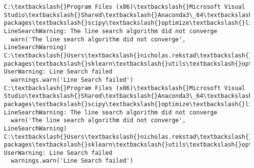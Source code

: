 \documentclass[11pt]{article}
\begin{document}
    \begin{Verbatim}[commandchars=\\\{\}]
C:\textbackslash{}Program Files (x86)\textbackslash{}Microsoft Visual Studio\textbackslash{}Shared\textbackslash{}Anaconda3\_64\textbackslash{}lib\textbackslash{}site-packages\textbackslash{}scipy\textbackslash{}optimize\textbackslash{}linesearch.py:313: LineSearchWarning: The line search algorithm did not converge
  warn('The line search algorithm did not converge', LineSearchWarning)
C:\textbackslash{}Users\textbackslash{}nicholas.rekstad\textbackslash{}AppData\textbackslash{}Roaming\textbackslash{}Python\textbackslash{}Python36\textbackslash{}site-packages\textbackslash{}sklearn\textbackslash{}utils\textbackslash{}optimize.py:195: UserWarning: Line Search failed
  warnings.warn('Line Search failed')
C:\textbackslash{}Program Files (x86)\textbackslash{}Microsoft Visual Studio\textbackslash{}Shared\textbackslash{}Anaconda3\_64\textbackslash{}lib\textbackslash{}site-packages\textbackslash{}scipy\textbackslash{}optimize\textbackslash{}linesearch.py:313: LineSearchWarning: The line search algorithm did not converge
  warn('The line search algorithm did not converge', LineSearchWarning)
C:\textbackslash{}Users\textbackslash{}nicholas.rekstad\textbackslash{}AppData\textbackslash{}Roaming\textbackslash{}Python\textbackslash{}Python36\textbackslash{}site-packages\textbackslash{}sklearn\textbackslash{}utils\textbackslash{}optimize.py:195: UserWarning: Line Search failed
  warnings.warn('Line Search failed')

    \end{Verbatim}
\end{document}
